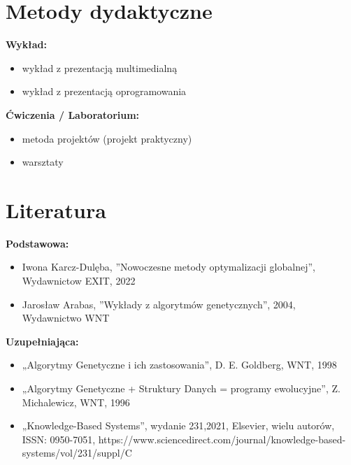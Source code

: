 \documentclass[12pt, a4paper]{article}
\begin{document}
\section{Metody dydaktyczne}

\textbf{Wykład:}
\begin{itemize}
  \item wykład z prezentacją multimedialną
  \item wykład z prezentacją oprogramowania
\end{itemize}
\vspace{4pt}
\textbf{Ćwiczenia / Laboratorium:}
\begin{itemize}
  \item metoda projektów (projekt praktyczny)
  \item warsztaty
\end{itemize}
\vspace{4pt}


\section{Literatura}

\textbf{Podstawowa:}
\begin{itemize}
  \item Iwona Karcz-Dulęba, ''Nowoczesne metody optymalizacji globalnej'', Wydawnictow EXIT, 2022
  \item Jarosław Arabas, ''Wykłady z algorytmów genetycznych'', 2004, Wydawnictwo WNT
\end{itemize}

\textbf{Uzupełniająca:}
\begin{itemize}
  \item „Algorytmy Genetyczne i ich zastosowania”, D. E. Goldberg, WNT, 1998
  \item „Algorytmy Genetyczne + Struktury Danych = programy ewolucyjne”, Z. Michalewicz, WNT, 1996
  \item „Knowledge-Based Systems”, wydanie 231,2021, Elsevier, wielu autorów, ISSN: 0950-7051, https://www.sciencedirect.com/journal/knowledge-based-systems/vol/231/suppl/C
\end{itemize}
\end{document}
